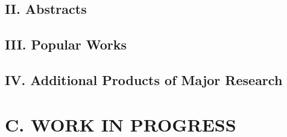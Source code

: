 \documentclass{res}
\newcommand{\MarginText}[1]{\section{#1}\vspace{10pt}}
\begin{document}
\begin{resume}
  \subsection{II. Abstracts}
  \subsection{III. Popular Works}
  \subsection{IV. Additional Products of Major Research}
  \nocite{*}
  \vspace{10pt}
  \printbibliography[heading=none]

  \MarginText{C. WORK IN PROGRESS}
  \clearpage

\end{resume}
\end{document}
